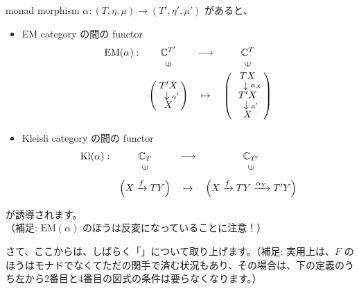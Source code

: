 \documentclass[
		head_space=20mm,
		foot_space=20mm,
		gutter=10mm,
		line_length=190mm
]{jlreq}
\begin{document}
	\noindent 
	monad morphism $\alpha:(T,\eta,\mu)\to (T',\eta',\mu')$ があると、
	\begin{itemize}
		\item EM category の間の functor %
		\[\begin{array}{cccc} \mathrm{EM}(\alpha):&\C^{T'}&\longrightarrow&\C^{T}\\&\rotatebox{90}{$\in$}&&\rotatebox{90}{$\in$}\\&\left(\!\!\begin{array}{c}T'X\\[-2pt]~~\downarrow\substack{a'}\\[-2pt]X\end{array}\!\!\right) & \mapsto & \left(\!\!\begin{array}{c}TX\\[-2pt]~~~\downarrow\substack{\alpha_X}\\[-2pt]T'X\\[-2pt]~~\downarrow\substack{a'}\\[-2pt]X\end{array}\!\!\right) \end{array}\]
		\item Kleisli category の間の functor %
		\[\begin{array}{cccc} \mathrm{Kl}(\alpha):& \C_T&\longrightarrow&\C_{T'} \\ & \rotatebox{90}{$\in$} && \rotatebox{90}{$\in$} \\[5pt] & \left(X\xrightarrow{f}TY\right) & \mapsto & \left(X\xrightarrow{f}TY\xrightarrow{\alpha_Y}T'Y\right) \end{array}\]
	\end{itemize}
	が誘導されます。\\（補足: $\mathrm{EM}(\alpha)$ のほうは反変になっていることに注意！）

\clearpage

さて、ここからは、しばらく「」について取り上げます。（補足: 実用上は、$F$ のほうはモナドでなくてただの関手で済む状況もあり、その場合は、下の定義のうち左から2番目と4番目の図式の条件は要らなくなります。）


\end{document}
